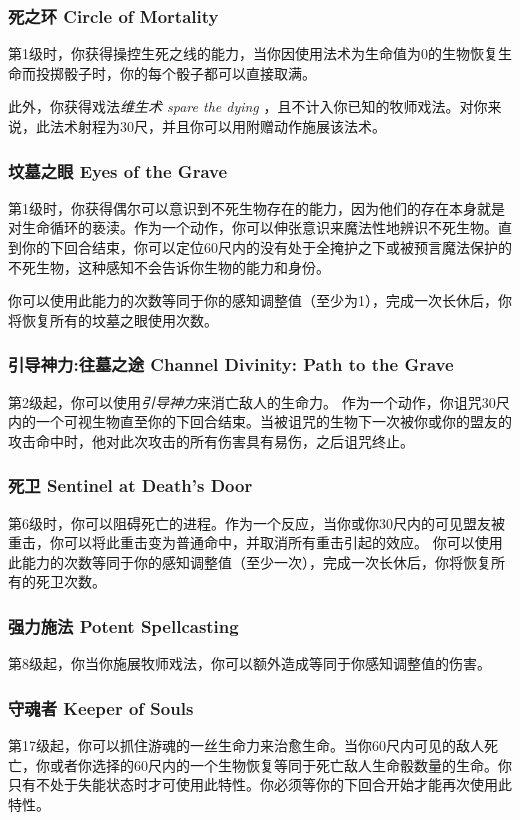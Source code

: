 \subsubsection{死之环 Circle of Mortality}
第1级时，你获得操控生死之线的能力，当你因使用法术为生命值为0的生物恢复生命而投掷骰子时，你的每个骰子都可以直接取满。

此外，你获得戏法\emph{维生术 spare the dying }，且不计入你已知的牧师戏法。对你来说，此法术射程为30尺，并且你可以用附赠动作施展该法术。

\subsubsection{坟墓之眼 Eyes of the Grave}
第1级时，你获得偶尔可以意识到不死生物存在的能力，因为他们的存在本身就是对生命循环的亵渎。作为一个动作，你可以伸张意识来魔法性地辨识不死生物。直到你的下回合结束，你可以定位60尺内的没有处于全掩护之下或被预言魔法保护的不死生物，这种感知不会告诉你生物的能力和身份。

你可以使用此能力的次数等同于你的感知调整值（至少为1），完成一次长休后，你将恢复所有的坟墓之眼使用次数。

\subsubsection{引导神力:往墓之途 Channel Divinity: Path to the Grave}
第2级起，你可以使用\emph{引导神力}来消亡敌人的生命力。
作为一个动作，你诅咒30尺内的一个可视生物直至你的下回合结束。当被诅咒的生物下一次被你或你的盟友的攻击命中时，他对此次攻击的所有伤害具有易伤，之后诅咒终止。

\subsubsection{死卫 Sentinel at Death's Door}
第6级时，你可以阻碍死亡的进程。作为一个反应，当你或你30尺内的可见盟友被重击，你可以将此重击变为普通命中，并取消所有重击引起的效应。
你可以使用此能力的次数等同于你的感知调整值（至少一次），完成一次长休后，你将恢复所有的死卫次数。

\subsubsection{强力施法 Potent Spellcasting}
第8级起，你当你施展牧师戏法，你可以额外造成等同于你感知调整值的伤害。

\subsubsection{守魂者 Keeper of Souls}
第17级起，你可以抓住游魂的一丝生命力来治愈生命。当你60尺内可见的敌人死亡，你或者你选择的60尺内的一个生物恢复等同于死亡敌人生命骰数量的生命。你只有不处于失能状态时才可使用此特性。你必须等你的下回合开始才能再次使用此特性。